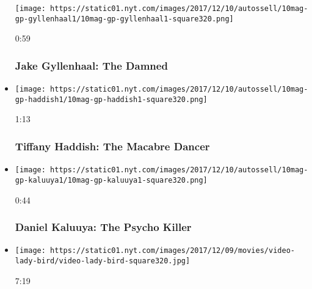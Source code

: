 \begin{itemize}
  \texttt{[image: https://static01.nyt.com/images/2017/12/10/autossell/10mag-gp-gyllenhaal1/10mag-gp-gyllenhaal1-square320.png]}

  0:59

  \hypertarget{jake-gyllenhaal-the-damned}{%
  \subsubsection{Jake Gyllenhaal: The
  Damned}\label{jake-gyllenhaal-the-damned}}
\item
  \href{https://www.nytimes.com/video/magazine/100000005588881/tiffany-haddish-the-macabre-dancer.html?action=click\&module=video-series-bar\&region=header\&pgtype=Article\&playlistId=video/magazine}{}

  \texttt{[image: https://static01.nyt.com/images/2017/12/10/autossell/10mag-gp-haddish1/10mag-gp-haddish1-square320.png]}

  1:13

  \hypertarget{tiffany-haddish-the-macabre-dancer}{%
  \subsubsection{Tiffany Haddish: The Macabre
  Dancer}\label{tiffany-haddish-the-macabre-dancer}}
\item
  \href{https://www.nytimes.com/video/magazine/100000005588890/daniel-kaluuya-the-psycho-killer.html?action=click\&module=video-series-bar\&region=header\&pgtype=Article\&playlistId=video/magazine}{}

  \texttt{[image: https://static01.nyt.com/images/2017/12/10/autossell/10mag-gp-kaluuya1/10mag-gp-kaluuya1-square320.png]}

  0:44

  \hypertarget{daniel-kaluuya-the-psycho-killer}{%
  \subsubsection{Daniel Kaluuya: The Psycho
  Killer}\label{daniel-kaluuya-the-psycho-killer}}
\item
  \href{https://www.nytimes.com/video/magazine/100000005555132/the-10-great-performers-of-2017-and-why-we-chose-them.html?action=click\&module=video-series-bar\&region=header\&pgtype=Article\&playlistId=video/magazine}{}

  \texttt{[image: https://static01.nyt.com/images/2017/12/09/movies/video-lady-bird/video-lady-bird-square320.jpg]}

  7:19


\end{itemize}
